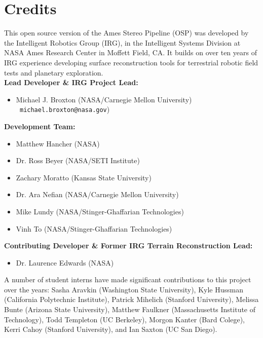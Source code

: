 
\chapter*{Credits}

This open source version of the Ames Stereo Pipeline (OSP) was
developed by the Intelligent Robotics Group (IRG), in the Intelligent
Systems Division at NASA Ames Research Center in Moffett Field, CA. It
builds on over ten years of IRG experience developing surface
reconstruction tools for terrestrial robotic field tests and planetary
exploration. \\

{\bf Lead Developer \& IRG Project Lead:}
\begin {itemize} 
\item Michael J. Broxton (NASA/Carnegie Mellon University)\\ {\tt
  michael.broxton@nasa.gov})\\
\end{itemize}

{\bf Development Team:}
\begin{itemize}
\item Matthew Hancher (NASA)
\item Dr. Ross Beyer (NASA/SETI Institute)
\item Zachary Moratto (Kansas State University)
\item Dr. Ara Nefian (NASA/Carnegie Mellon University)
\item Mike Lundy (NASA/Stinger-Ghaffarian Technologies)\\ 
\item Vinh To (NASA/Stinger-Ghaffarian Technologies)
\end{itemize}

{\bf Contributing Developer \& Former IRG Terrain Reconstruction Lead:}
\begin{itemize}
\item Dr. Laurence Edwards (NASA)
\end{itemize}

A number of student interns have made significant contributions to
this project over the years: Sasha Aravkin (Washington State
University), Kyle Hussman (California Polytechnic Institute), Patrick
Mihelich (Stanford University), Melissa Bunte (Arizona State
University), Matthew Faulkner (Massachusetts Institute of Technology),
Todd Templeton (UC Berkeley), Morgon Kanter (Bard Colege), Kerri Cahoy
(Stanford University), and Ian Saxton (UC San Diego).

